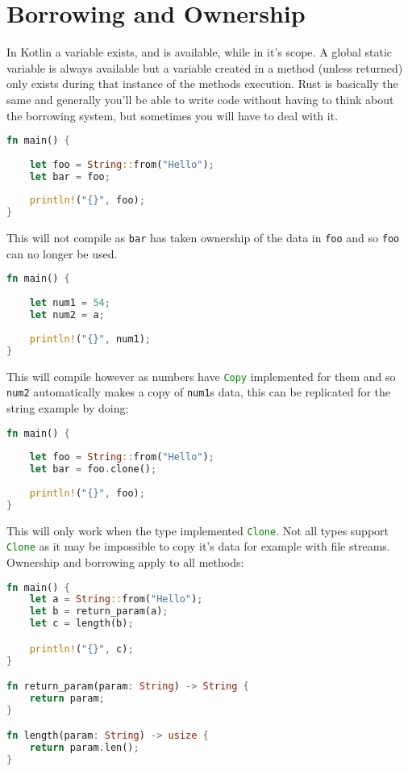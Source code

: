 \documentclass[a4paper,11pt]{article}
\begin{document}
\newpage
\section{Borrowing and Ownership}
In Kotlin a variable exists, and is available, while in it's scope. A global static variable is always available but a variable created in a method (unless returned) only exists during that instance of the methods execution. Rust is basically the same and generally you'll be able to write code without having to think about the borrowing system, but sometimes you will have to deal with it.
\begin{lstlisting}[language=Rust,frame=single,backgroundcolor=\color{palered}]
fn main() {
    
    let foo = String::from("Hello");
    let bar = foo;
    
    println!("{}", foo);
}
\end{lstlisting}

This will not compile as \lstinline{bar} has taken ownership of the data in \lstinline{foo} and so \lstinline{foo} can no longer be used.

\begin{lstlisting}[language=Rust,frame=single]
fn main() {
    
    let num1 = 54;
    let num2 = a;
    
    println!("{}", num1);
}
\end{lstlisting}

This will compile however as numbers have \lstinline[language=Rust]{Copy} implemented for them and so \lstinline{num2} automatically makes a copy of \lstinline{num1}s data, this can be replicated for the string example by doing:

\begin{lstlisting}[language=Rust,frame=single]
fn main() {
    
    let foo = String::from("Hello");
    let bar = foo.clone();
    
    println!("{}", foo);
}
\end{lstlisting}
This will only work when the type implemented \lstinline[language=Rust]{Clone}. Not all types support \lstinline[language=Rust]{Clone} as it may be impossible to copy it's data for example with file streams.
\newpage
Ownership and borrowing apply to all methods:

\begin{lstlisting}[language=Rust,frame=single]
fn main() {
    let a = String::from("Hello");
    let b = return_param(a);
    let c = length(b);

    println!("{}", c);
}

fn return_param(param: String) -> String {
	return param;
}

fn length(param: String) -> usize {
	return param.len();
}
\end{lstlisting}
\end{document}

